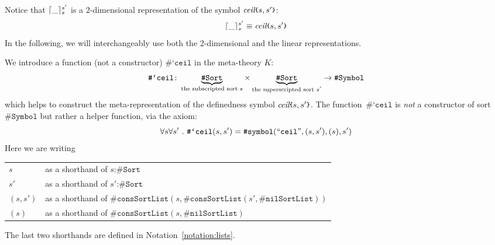\documentclass[UTF8,11pt]{article}
\theoremstyle{plain}
\theoremstyle{definition}
\theoremstyle{remark}
\DeclarePairedDelimiter{\ceil}{\lceil}{\rceil}
\newcommand{\cln}{\texttt{:}}
\newcommand{\itceil}{\textit{ceil}}
\newcommand{\parametric}[2]{{#1}\raisebox{.2ex}{\texttt{\footnotesize{\{}}}#2\raisebox{.2ex}{\texttt{\footnotesize{\}}}}}
\newcommand{\sharpsymbol}{\#}
\newcommand{\KSort}{\texttt{\sharpsymbol Sort}}
\newcommand{\KSymbol}{\texttt{\sharpsymbol Symbol}}
\newcommand{\Ksymbol}{\texttt{\sharpsymbol symbol}}
\newcommand{\KSymbolceil}{\texttt{\sharpsymbol `ceil}}
\newcommand{\KnilKSortList}{\texttt{\sharpsymbol nilSortList}}
\newcommand{\KconsKSortList}{\texttt{\sharpsymbol consSortList}}
\newcommand{\qquottt}[1]{\textrm{``\texttt{#1}''}}
\begin{document}
Notice that $\ceil{\_}_s^{s'}$ is a 2-dimensional representation of the symbol 
$\parametric{\itceil}{s,s'}$:
$$ \ceil{\_}_s^{s'} \equiv \parametric{\itceil}{s,s'} $$
In the following, we will interchangeably use both the 2-dimensional 
and the linear representations.

We introduce a function (not a constructor) $\KSymbolceil$ in the meta-theory 
$K$:
\begin{equation*}
 \KSymbolceil \colon 
 \underbrace{\KSort}_\text{the subscripted sort $s$}
 \times 
 \underbrace{\KSort}_\text{the superscripted sort $s'$} \to \KSymbol \\
\end{equation*}
which helps to construct the meta-representation of the definedness symbol 
$\parametric{\itceil}{s,s'}$.
The function~$\KSymbolceil$ is \emph{not} a constructor of sort $\KSymbol$ but 
rather a helper function, via the axiom:
\begin{equation*}
 \forall s \forall s' \ .\ \KSymbolceil(s, s') = \Ksymbol(\qquottt{ceil}, (s,s'), 
 (s), s')
\end{equation*}
Here we are writing
\begin{center}
\begin{tabular}{ll}
	$s$ & as a shorthand of $s \cln \KSort$ \\
	$s'$ & as a shorthand of $s' \cln \KSort$ \\
    $(s,s')$ & as a shorthand of 
    $\KconsKSortList(s,\KconsKSortList(s',\KnilKSortList))$ \\
    $(s)$ & as a shorthand of $\KconsKSortList(s,\KnilKSortList)$
\end{tabular}
\end{center}
The last two shorthands are defined in Notation~\ref{notation:lists}.
\end{document}
